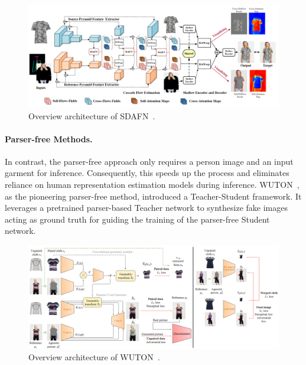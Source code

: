 \begin{figure}[h!]
    \centering
    \includegraphics[width=\linewidth]{content/resources/images/literature-review/sdafn.png}
    \caption{Overview architecture of SDAFN~\cite{Bai-ECCV2022-Single}.}
    \label{fig:vton-sdafn}
\end{figure}

\paragraph{Parser-free Methods.} In contrast, the parser-free approach only requires a person image and an input garment for inference. Consequently, this speeds up the process and eliminates reliance on human representation estimation models during inference. WUTON~\cite{Issenhuth-ECCV2020-Do}, as the pioneering parser-free method, introduced a Teacher-Student framework. It leverages a pretrained parser-based Teacher network to synthesize fake images acting as ground truth for guiding the training of the parser-free Student network.

\begin{figure}[h!]
    \centering
    \includegraphics[width=\linewidth]{content/resources/images/literature-review/wuton.png}
    \caption{Overview architecture of WUTON~\cite{Issenhuth-ECCV2020-Do}.}
    \label{fig:vton-wuton}
\end{figure}

